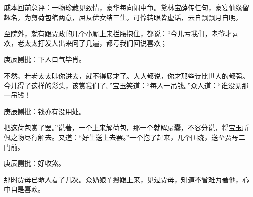 
\begin{parag}
    \begin{note}戚本回前总评：一物珍藏见致情，豪华每向闹中争。黛林宝薛传佳句，豪宴仙缘留趣名。为剪荷包绾两意，屈从优女结三生。可怜转眼皆虚话，云自飘飘月自明。\end{note}
\end{parag}


\begin{parag}
    至院外，就有跟贾政的几个小厮上来拦腰抱住，都说：“今儿亏我们，老爷才喜欢，老太太打发人出来问了几遍，都亏我们回说喜欢；\begin{note}庚辰侧批：下人口气毕肖。\end{note}不然，若老太太叫你进去，就不得展才了。人人都说，你才那些诗比世人的都强。今儿得了这样的彩头，该赏我们了。”宝玉笑道：“每人一吊钱。”众人道：“谁没见那一吊钱！\begin{note}庚辰侧批：钱亦有没用处。\end{note}把这荷包赏了罢。”说著，一个上来解荷包，那一个就解扇囊，不容分说，将宝玉所佩之物尽行解去。又道：“好生送上去罢。”一个抱了起来，几个围绕，送至贾母二门前。\begin{note}庚辰侧批：好收煞。\end{note}那时贾母已命人看了几次。众奶娘丫鬟跟上来，见过贾母，知道不曾难为著他，心中自是喜欢。
\end{parag}


